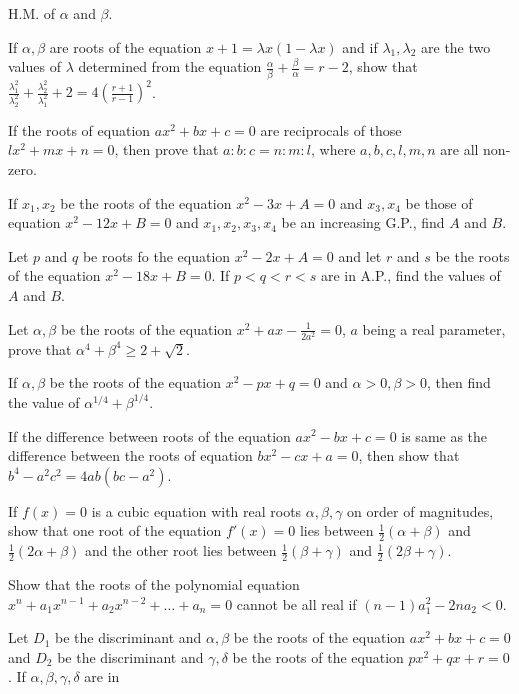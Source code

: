   H.M. of $\alpha$ and $\beta$.
\item If $\alpha, \beta$ are roots of the equation $x + 1 = \lambda x(1 - \lambda x)$ and if $\lambda_1, \lambda_2$ are the two
  values of $\lambda$ determined from the equation $\frac{\alpha}{\beta} + \frac{\beta}{\alpha} = r - 2$, show that
  $\frac{\lambda_1^2}{\lambda_2^2} + \frac{\lambda_2^2}{\lambda_1^2} + 2 = 4\left(\frac{r + 1}{r - 1}\right)^2$.
\item If the roots of equation $ax^2 + bx + c = 0$ are reciprocals of those $lx^2 + mx + n = 0$, then prove that $a:b:c = n:m:l$,
  where $a, b, c, l, m, n$ are all non-zero.
\item If $x_1, x_2$ be the roots of the equation $x^2 - 3x + A = 0$ and $x_3, x_4$ be those of equation $x^2 - 12x + B = 0$ and
  $x_1, x_2, x_3, x_4$ be an increasing G.P., find $A$ and $B$.
\item Let $p$ and $q$ be roots fo the equation $x^2 - 2x + A = 0$ and let $r$ and $s$ be the roots of the equation $x^2 - 18x + B =
  0$. If $p<q<r<s$ are in A.P., find the values of $A$ and $B$.
\item Let $\alpha, \beta$ be the roots of the equation $x^2 + ax - \frac{1}{2a^2} = 0$, $a$ being a real parameter, prove that
  $\alpha^4 + \beta^4\geq 2 + \sqrt{2}$.
\item If $\alpha, \beta$ be the roots of the equation $x^2 - px + q = 0$ and $\alpha > 0, \beta > 0$, then find the value of
  $\alpha^{1/4} + \beta^{1/4}$.
\item If the difference between roots of the equation $ax^2 - bx + c = 0$ is same as the difference between the roots of equation
  $bx^2 - cx + a = 0$, then show that $b^4 - a^2c^2 = 4ab(bc - a^2)$.
\item If $f(x) = 0$ is a cubic equation with real roots $\alpha, \beta, \gamma$ on order of magnitudes, show that one root of the
  equation $f'(x) = 0$ lies between $\frac{1}{2}(\alpha + \beta)$ and $\frac{1}{2}(2\alpha + \beta)$ and the other root lies
  between $\frac{1}{2}(\beta + \gamma)$ and $\frac{1}{2}(2\beta + \gamma)$.
\item Show that the roots of the polynomial equation $x^n + a_1x^{n - 1} + a_2x^{n - 2} + \ldots + a_n = 0$ cannot be all real if
  $(n - 1)a_1^2 - 2na_2 < 0$.
\item Let $D_1$ be the discriminant and $\alpha, \beta$ be the roots of the equation $ax^2 + bx + c = 0$ and $D_2$ be the
  discriminant and $\gamma, \delta$ be the roots of the equation $px^2 + qx + r = 0$. If $\alpha, \beta, \gamma, \delta$ are in

